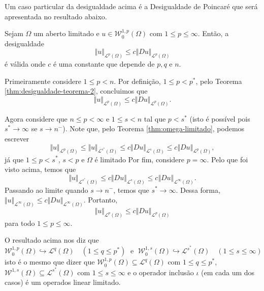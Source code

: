 \documentclass[a4paper, 11pt]{book}
\theoremstyle{definition}
\newcommand{\cL}{\mathcal{L}}
\newcommand{\cW}{\mathcal{W}}
\begin{document}
Um caso particular da desigualdade acima é a Desigualdade de Poincaré que será apresentada no resultado abaixo.

\begin{cbox}
   Sejam $\Omega$ um aberto limitado e $u \in \cW^{1,p}_0(\Omega)$ com $1 \leqslant p \leqslant \infty$. Então, a desigualdade
   \[
        \Vert u \Vert_{\cL^p(\Omega)} \leqslant c\Vert Du \Vert_{\cL^p(\Omega)}
   \]
   é válida
   onde $c$ é uma constante que depende de $p, q$ e $n$.
\end{cbox}
\begin{prf}
    Primeiramente considere $1 \leqslant p < n$.
    Por definição, $1 \leqslant p < p^*$, pelo Teorema \ref{thm:desigualdade-teorema-2}, concluimos que
    \[
        \Vert u \Vert_{\cL^p(\Omega)} \leqslant c \Vert Du \Vert_{\cL^p(\Omega)}.
    \]

    Agora considere que $n \leqslant p < \infty$ e $1 \leqslant s < n$ tal que $p < s^*$ (isto é possível pois $s^* \to \infty$ se $s \to n^-$).
    Note que, pelo Teorema \ref{thm:omega-limitado}, podemos escrever
    \[
        \Vert u \Vert_{\cL^p(\Omega)} \leqslant \Vert u \Vert_{\cL^{s^*}(\Omega)} \leqslant c \Vert Du \Vert_{\cL^s(\Omega)} \leqslant c \Vert Du \Vert_{\cL^p(\Omega)},
    \]
    já que $1 \leqslant p < s^*$, $s < p$ e $\Omega$ é limitado
    Por fim, considere $p = \infty$.
    Pelo que foi visto acima, temos que
    \[
        \Vert u \Vert_{\cL^{s^*}(\Omega)} \leqslant c \Vert Du \Vert_{\cL^{s}(\Omega)} \leqslant c \Vert Du \Vert_{\cL^\infty(\Omega)}.
    \]
    Passando ao limite quando $s \to n^-$, temos que $s^* \to \infty$. Dessa forma, $\Vert u \Vert_{\cL^\infty(\Omega)} \leqslant c \Vert Du \Vert_{\cL^\infty(\Omega)}$.
    Portanto,
    \[
        \Vert u \Vert_{\cL^p(\Omega)} \leqslant c\Vert Du \Vert_{\cL^p(\Omega)}
    \]
    para todo $1 \leqslant p \leqslant \infty$.
\end{prf}

O resultado acima nos diz que
\[
    \cW^{1,p}_0(\Omega) \hookrightarrow \cL^q(\Omega) \quad (1 \leqslant q \leqslant p^*) \;\text{ e }\; \cW^{1,s}_0(\Omega) \hookrightarrow \cL^{s^*}(\Omega) \quad (1 \leqslant s \leqslant \infty)
\]
isto é o mesmo que dizer que $\cW^{1,p}_0(\Omega) \subseteq \cL^q(\Omega)$ com $1 \leqslant q \leqslant p^*$, $\cW^{1,s}(\Omega) \subseteq \cL^{s^*}(\Omega)$ com $1 \leqslant s \leqslant \infty$ e o operador inclusão $\iota$ (em cada um dos casos) é um operados linear limitado.
\end{document}
